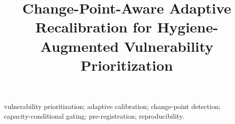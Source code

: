 \documentclass[journal]{IEEEtran}
\title{Change-Point-Aware Adaptive Recalibration for
Hygiene-Augmented Vulnerability Prioritization}
\author{%
  \IEEEauthorblockN{Harshavardhan Malla}
  \IEEEauthorblockA{Independent Researcher\\
  Harshavardhanmalla75@gmail.com}%
}
\begin{document}
\maketitle

\begin{abstract}

\end{abstract}

\begin{IEEEkeywords}
vulnerability prioritization; adaptive calibration; change-point detection;
capacity-conditional gating; pre-registration; reproducibility.
\end{IEEEkeywords}















\end{document}
